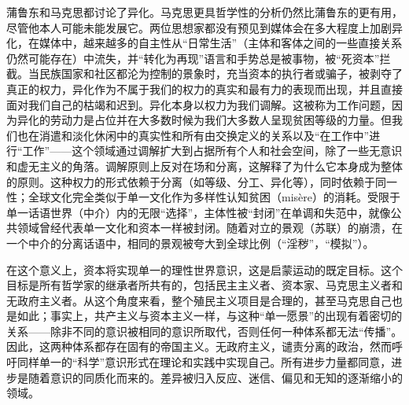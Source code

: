 \documentclass[DIV=12,%
               BCOR=0mm,%
               headinclude=false,%
               footinclude=false,open=any,%
               fontsize=10pt,%
               oneside,%
               paper=210mm:11in]%
               {scrbook}
\begin{document}
蒲鲁东和马克思都讨论了异化。马克思更具哲学性的分析仍然比蒲鲁东的更有用，尽管他本人可能未能发展它。两位思想家都没有预见到媒体会在多大程度上加剧异化，在媒体中，越来越多的自主性从“日常生活”（主体和客体之间的一些直接关系仍然可能存在）中流失，并“转化为再现”语言和手势总是被事物，被“死资本”拦截。当民族国家和社区都沦为控制的景象时，充当资本的执行者或骗子，被剥夺了真正的权力，异化作为不属于我们的权力的真实和最有力的表现而出现，并且直接面对我们自己的枯竭和迟到。异化本身以权力为我们调解。这被称为工作问题，因为异化的劳动力是占位并在大多数时候为我们大多数人呈现贫困等级的力量。但我们也在消遣和淡化休闲中的真实性和所有由交换定义的关系以及“在工作中”进行“工作”——这个领域通过调解扩大到占据所有个人和社会空间，除了一些无意识和虚无主义的角落。调解原则上反对在场和分离，这解释了为什么它本身成为整体的原则。这种权力的形式依赖于分离（如等级、分工、异化等），同时依赖于同一性；全球文化完全类似于单一文化作为多样性认知贫困（misère）的消耗。受限于单一话语世界（中介）内的无限“选择”，主体性被“封闭”在单调和失范中，就像公共领域曾经代表单一文化和资本一样被封闭。随着对立的景观（苏联）的崩溃，在一个中介的分离话语中，相同的景观被夸大到全球比例（“淫秽”，“模拟”）。


在这个意义上，资本将实现单一的理性世界意识，这是启蒙运动的既定目标。这个目标是所有哲学家的继承者所共有的，包括民主主义者、资本家、马克思主义者和无政府主义者。从这个角度来看，整个殖民主义项目是合理的，甚至马克思自己也是如此；事实上，共产主义与资本主义一样，与这种“单一愿景”的出现有着密切的关系——除非不同的意识被相同的意识所取代，否则任何一种体系都无法“传播”。因此，这两种体系都存在固有的帝国主义。无政府主义，谴责分离的政治，然而呼吁同样单一的“科学”意识形式在理论和实践中实现自己。所有进步力量都同意，进步是随着意识的同质化而来的。差异被归入反应、迷信、偏见和无知的逐渐缩小的领域。
\end{document}
